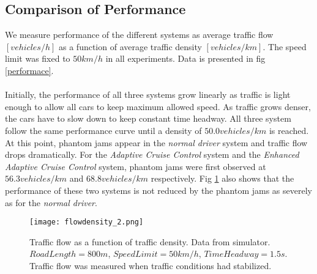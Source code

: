 \subsection{Comparison of Performance}
We measure performance of the different systems as average traffic flow
$ [\unit{vehicles/h}] $ as a function of average traffic density
$ [\unit{vehicles/km}] $. The speed limit was fixed to $ 50 \unit{km/h} $ in all
experiments. Data is presented in fig \ref{performace}.\\\\

Initially, the performance of all three systems grow linearly as traffic is
light enough to allow all cars to keep maximum allowed speed. As traffic grows
denser, the cars have to slow down to keep constant time headway. All three
system follow the same performance curve until a density of $ 50.0
\unit{vehicles/km} $ is reached. At this point, phantom jams appear in the
\emph{normal driver} system and traffic flow drops dramatically. For the
\emph{Adaptive Cruise Control} system and the \emph{Enhanced Adaptive Cruise
Control} system, phantom jams were first observed at $ 56.3 \unit{vehicles/km} $
and $ 68.8 \unit{vehicles/km} $ respectively. Fig \ref{performance} also shows
that the performance of these two systems is not reduced by the phantom jams
as severely as for the \emph{normal driver}.

\begin{figure}[h!]
    \begin{center}
    \texttt{[image: flowdensity\_2.png]}
    \caption{\label{performance}
Traffic flow as a function of traffic density. Data from simulator.
$ RoadLength=800 \unit{m} $, $ SpeedLimit=50 \unit{km/h} $, $ TimeHeadway=1.5
\unit{s} $. Traffic flow was measured when traffic conditions had stabilized.}
    \end{center}
\end{figure}


